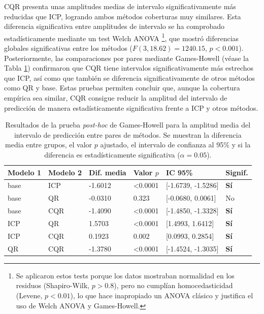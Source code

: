 CQR presenta unas amplitudes medias de intervalo significativamente más reducidas que ICP, logrando ambos métodos coberturas muy similares. Esta diferencia significativa entre amplitudes de intervalo se ha comprobado estadísticamente mediante un test Welch ANOVA%
\footnote{
    Se aplicaron estos tests porque los datos mostraban normalidad en los residuos (Shapiro-Wilk, $p>0.8$), pero no cumplían homocedasticidad (Levene, $p<0.01$), lo que hace inapropiado un ANOVA clásico y justifica el uso de Welch ANOVA y Games-Howell.
},
que mostró diferencias globales significativas entre los métodos ($F(3, 18.62) = 1240.15$, $p < 0.001$). Posteriormente, las comparaciones por pares mediante Games-Howell (véase la Tabla \ref{tab:AE_games-howell_width}) confirmaron que CQR tiene intervalos significativamente más estrechos que ICP, así como que también se diferencia significativamente de otros métodos como QR y base. Estas pruebas permiten concluir que, aunque la cobertura empírica sea similar, CQR consigue reducir la amplitud del intervalo de predicción de manera estadísticamente significativa frente a ICP y otros métodos.

\renewcommand{\arraystretch}{1.2}
\begin{table}[htbp]
    \small
    \centering
    \begin{tabular}{llllll}
    \toprule
    \textbf{Modelo 1} & \textbf{Modelo 2} & \textbf{Dif. media} & \textbf{Valor $p$} & \textbf{IC 95\%} & \textbf{Signif.} \\ 
    \hline
    base & ICP & -1.6012 & \textless 0.0001 & [-1.6739, -1.5286] & \textbf{Sí} \\
    base & QR & -0.0310 &  0.323 & [-0.0680, 0.0061] & No \\
    base & CQR & -1.4090 & \textless 0.0001 & [-1.4850, -1.3328] & \textbf{Sí} \\
    ICP & QR & 1.5703 & \textless 0.0001 & [1.4993, 1.6412] & \textbf{Sí} \\
    ICP & CQR & 0.1923 &  0.002 & [0.0993, 0.2854] & \textbf{Sí} \\
    QR & CQR & -1.3780 & \textless 0.0001 & [-1.4524, -1.3035] & \textbf{Sí} \\
    \bottomrule
    \end{tabular}
    \caption[
        Resultados de la prueba \textit{post-hoc} de Games-Howell para la amplitud media del intervalo de predicción entre pares de métodos.
    ]{
        Resultados de la prueba \textit{post-hoc} de Games-Howell para la amplitud media del intervalo de predicción entre pares de métodos.
        Se muestran la diferencia media entre grupos, el valor $p$ ajustado, el intervalo de confianza al 95\% y si la diferencia es estadísticamente significativa ($\alpha = 0.05$).
    }
    \label{tab:AE_games-howell_width}
\end{table}

